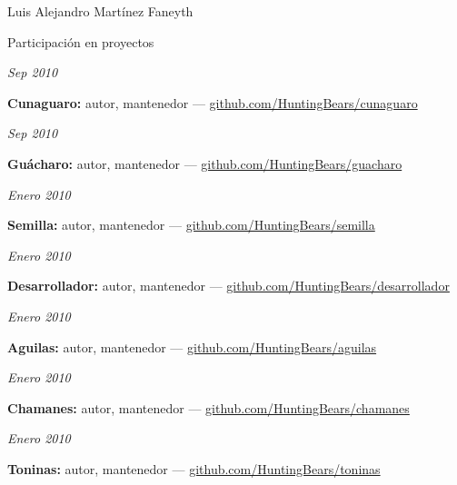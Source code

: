 \documentclass[11pt,letterpaper]{article}
\begin{document}
\begin{cv}{Luis Alejandro Mart\'inez Faneyth}
\begin{cvlist}{Participaci\'on en proyectos}
\item[{\parbox[t]{6em}{\textit{\large{Sep 2010}}}}]{
	\parbox[t]{\linewidth}{
		\textbf{Cunaguaro:} autor, mantenedor --- \href{http://github.com/HuntingBears/cunaguaro}{github.com/HuntingBears/cunaguaro}
	}
}
\item[{\parbox[t]{6em}{\textit{\large{Sep 2010}}}}]{
	\parbox[t]{\linewidth}{
		\textbf{Gu\'acharo:} autor, mantenedor --- \href{http://github.com/HuntingBears/guacharo}{github.com/HuntingBears/guacharo}
	}
}
\item[{\parbox[t]{6em}{\textit{\large{Enero 2010}}}}]{
	\parbox[t]{\linewidth}{
		\textbf{Semilla:} autor, mantenedor --- \href{http://github.com/HuntingBears/semilla}{github.com/HuntingBears/semilla}
	}
}
\item[{\parbox[t]{6em}{\textit{\large{Enero 2010}}}}]{
	\parbox[t]{\linewidth}{
		\textbf{Desarrollador:} autor, mantenedor --- \href{http://github.com/HuntingBears/desarrollador}{github.com/HuntingBears/desarrollador}
	}
}
\item[{\parbox[t]{6em}{\textit{\large{Enero 2010}}}}]{
	\parbox[t]{\linewidth}{
		\textbf{Aguilas:} autor, mantenedor --- \href{http://github.com/HuntingBears/aguilas}{github.com/HuntingBears/aguilas}
	}
}
\item[{\parbox[t]{6em}{\textit{\large{Enero 2010}}}}]{
	\parbox[t]{\linewidth}{
		\textbf{Chamanes:} autor, mantenedor --- \href{http://github.com/HuntingBears/chamanes}{github.com/HuntingBears/chamanes}
	}
}
\item[{\parbox[t]{6em}{\textit{\large{Enero 2010}}}}]{
	\parbox[t]{\linewidth}{
		\textbf{Toninas:} autor, mantenedor --- \href{http://github.com/HuntingBears/toninas}{github.com/HuntingBears/toninas}
	}
}
\end{cvlist}


\end{cv}
\end{document}
